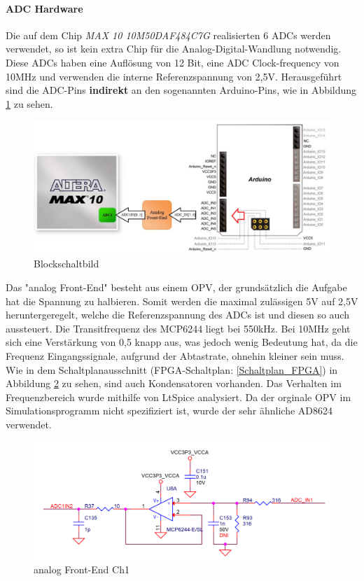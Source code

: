 \documentclass[a4paper,12pt]{article}
\begin{document}
\paragraph{ADC Hardware}
Die auf dem Chip \textit{MAX 10 10M50DAF484C7G} realisierten 6 ADCs werden verwendet, so ist kein extra Chip für die Analog-Digital-Wandlung notwendig. Diese ADCs haben eine Auflösung von 12 Bit, eine ADC Clock-frequency von 10MHz und verwenden die interne Referenzspannung von 2,5V. Herausgeführt sind die ADC-Pins \textbf{indirekt} an den sogenannten Arduino-Pins, wie in Abbildung \ref{ADC_Blockschaltbild} zu sehen.
\begin{figure}[!h]
\begin{center}
\includegraphics[width=15cm]{Grafiken/ADC_Arduino_Pins.PNG}
\caption{Blockschaltbild}
\label{ADC_Blockschaltbild}
\end{center}
\end{figure}
Das "analog Front-End" besteht aus einem OPV, der grundsätzlich die Aufgabe hat die Spannung zu halbieren. Somit werden die maximal zulässigen 5V auf 2,5V heruntergeregelt, welche die Referenzspannung des ADCs ist und diesen so auch aussteuert. Die Transitfrequenz des MCP6244 liegt bei 550kHz. Bei 10MHz geht sich eine Verstärkung von 0,5 knapp aus, was jedoch wenig Bedeutung hat, da die Frequenz Eingangssignale, aufgrund der Abtastrate, ohnehin kleiner sein muss. \\Wie in dem Schaltplanausschnitt (FPGA-Schaltplan: \ref{Schaltplan_FPGA}) in Abbildung \ref{Front-End_Schaltung} zu sehen, sind auch Kondensatoren vorhanden. Das Verhalten im Frequenzbereich wurde mithilfe von LtSpice analysiert. Da der orginale OPV im Simulationsprogramm nicht spezifiziert ist, wurde der sehr ähnliche AD8624 verwendet.
\begin{figure}[!h]
\begin{center}
\includegraphics[width=15cm]{Grafiken/ADC_Front-End.PNG}
\caption{analog Front-End Ch1}
\label{Front-End_Schaltung}
\end{center}
\end{figure}
\newline
\end{document}
